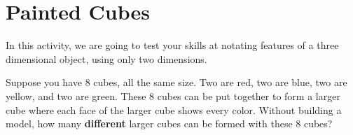 \newpage
\section{Painted Cubes}	

In this activity, we are going to test your skills at notating features
of a three dimensional object, using only two dimensions.


\begin{prob}
Suppose you have 8 cubes, all the same size. Two are red, two are
blue, two are yellow, and two are green. These 8 cubes can be put
together to form a larger cube where each face of the larger cube shows 
every color. Without building a model, how many \textbf{different} larger 
cubes can be formed with these 8 cubes?
\end{prob}
